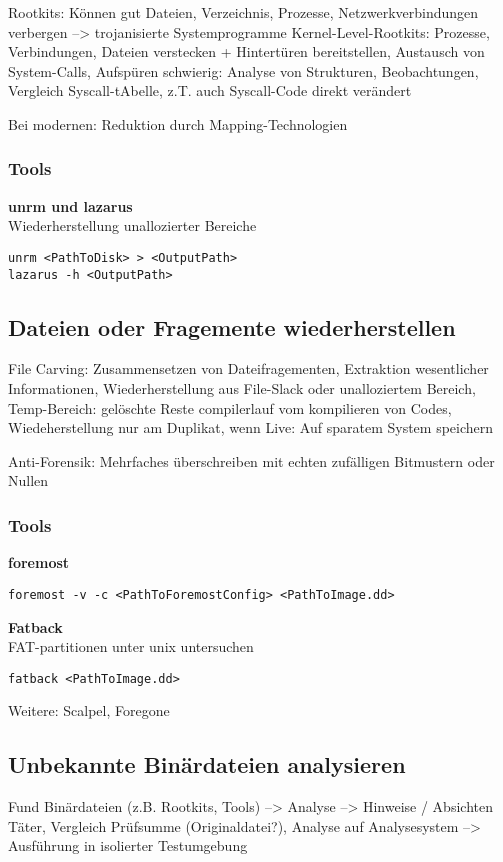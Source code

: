 Rootkits: Können gut Dateien, Verzeichnis, Prozesse, Netzwerkverbindungen verbergen --> trojanisierte Systemprogramme
Kernel-Level-Rootkits: Prozesse, Verbindungen, Dateien verstecken + Hintertüren bereitstellen, Austausch von System-Calls, Aufspüren schwierig: Analyse von Strukturen, Beobachtungen, Vergleich Syscall-tAbelle, z.T. auch Syscall-Code direkt verändert

Bei modernen: Reduktion durch Mapping-Technologien

\subsubsection{Tools}
\textbf{unrm und lazarus} \\
Wiederherstellung unallozierter Bereiche
\begin{lstlisting}
unrm <PathToDisk> > <OutputPath>
lazarus -h <OutputPath>
\end{lstlisting}


\subsection{Dateien oder Fragemente wiederherstellen}
File Carving: Zusammensetzen von Dateifragementen, Extraktion wesentlicher Informationen, Wiederherstellung aus File-Slack oder unalloziertem Bereich, 
Temp-Bereich: gelöschte Reste compilerlauf vom kompilieren von Codes, Wiedeherstellung nur am Duplikat, wenn Live: Auf sparatem System speichern

Anti-Forensik: Mehrfaches überschreiben mit echten zufälligen Bitmustern oder Nullen

\subsubsection{Tools}
\textbf{foremost} \\
\begin{lstlisting}
foremost -v -c <PathToForemostConfig> <PathToImage.dd>
\end{lstlisting}


\textbf{Fatback}\\
FAT-partitionen unter unix untersuchen
\begin{lstlisting}
fatback <PathToImage.dd>
\end{lstlisting}

Weitere: Scalpel, Foregone

\subsection{Unbekannte Binärdateien analysieren}
Fund Binärdateien (z.B. Rootkits, Tools) --> Analyse --> Hinweise / Absichten Täter, Vergleich Prüfsumme (Originaldatei?), Analyse auf Analysesystem --> Ausführung in isolierter Testumgebung

